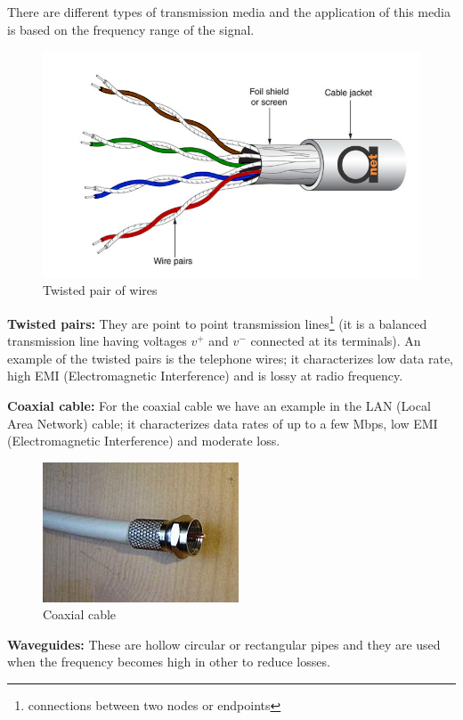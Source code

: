 There are different types of transmission media and the application of this media is based on the frequency range of the signal. \begin{figure}[h]
\centering
\includegraphics[width=1\linewidth]{./graphics/twistedpairs}
\caption{Twisted pair of wires}
\end{figure} 

\textbf{Twisted pairs:} They are point to point transmission lines\footnote{connections between two nodes or endpoints} (it is a balanced transmission line having voltages $v^{+}$ and $v^{-}$ connected at its terminals). An example of the twisted pairs is the telephone wires; it characterizes low data rate, high EMI (Electromagnetic Interference) and is lossy at radio frequency.

\textbf{Coaxial cable:} For the coaxial cable we have an example in the LAN (Local Area Network) cable; it characterizes data rates of up to a few Mbps, low EMI (Electromagnetic Interference) and moderate loss.
\begin{figure}[h]
\centering
\includegraphics[scale=0.4]{./graphics/coaxialcable}
\caption{Coaxial cable}
\end{figure}

\textbf{Waveguides:} These are hollow circular or rectangular pipes and they are used when the frequency becomes high in other to reduce losses. 

